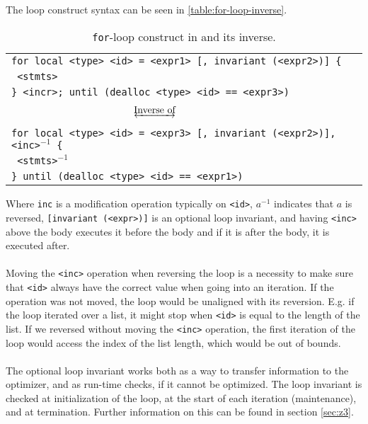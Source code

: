 The loop construct syntax can be seen in \autoref{table:for-loop-inverse}.
\begin{table}[!h]
    \centering
    \begin{tabular}{l}
        \texttt{for local <type> <id> = <expr1> [, invariant (<expr2>)] \{} \\
        \texttt{ <stmts>} \\
        \texttt{\} <incr>; until (dealloc <type> <id> == <expr3>)} \\ \\
        $~~~~~~~~~~~~~~~~~~~~~~~~~~~~~~~~~~~~~\underleftrightarrow{\text{Inverse of}}$ \\ \\
        \texttt{for local <type> <id> = <expr3> [, invariant (<expr2>)], <inc>$^{-1}$ \{ }\\
        \texttt{ <stmts>$^{-1}$} \\
        \texttt{\} until (dealloc <type> <id> == <expr1>)} 
    \end{tabular}
    \caption{\texttt{for}-loop construct in \lan and its inverse.}
    \label{table:for-loop-inverse}
\end{table}
\noindent
Where \texttt{inc} is a modification operation typically on \texttt{<id>}, $a^{-1}$ indicates that
$a$ is reversed, \texttt{[invariant (<expr>)]} is an optional loop invariant, and having
\texttt{<inc>} above the body executes it before the body and if it is after the body, it
is executed after.
\\
\\
Moving the \texttt{<inc>} operation when reversing the loop is a necessity to make sure that
\texttt{<id>} always have the correct value when going into an iteration. If the operation was not
moved, the loop would be unaligned with its reversion. E.g. if the loop iterated over a list,
it might stop when \texttt{<id>} is equal to the length of the list. If we reversed without moving
the \texttt{<inc>} operation, the first iteration of the loop would access the index of the list
length, which would be out of bounds.
\\
\\
The optional loop invariant works both as a way to transfer information to the optimizer, and
as run-time checks, if it cannot be optimized. The loop invariant is checked at initialization of
the loop, at the
start of each iteration (maintenance), and at termination. Further information on this can be found
in section \ref{sec:z3}.

